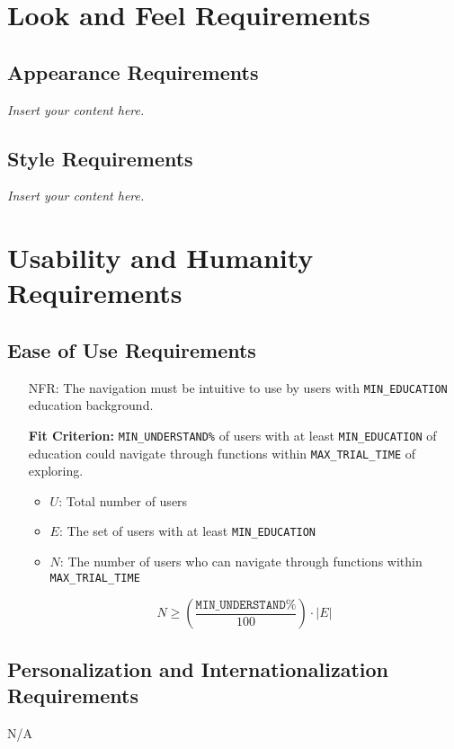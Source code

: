 \documentclass[12pt]{article}
\newcommand{\lips}{\textit{Insert your content here.}}
\newcounter{nfrnum} %
\newcommand{\rthenfrnum}{NFR\refstepcounter{nfrnum}\thenfrnum:}
\begin{document}
\section{Look and Feel Requirements}
\subsection{Appearance Requirements}
\lips
\subsection{Style Requirements}
\lips

\section{Usability and Humanity Requirements}
\subsection{Ease of Use Requirements}
\begin{itemize}
\item[\rthenfrnum]The navigation must be intuitive to use by users with \texttt{MIN\_EDUCATION} education background.

\textbf{Fit Criterion:} \texttt{MIN\_UNDERSTAND\%} of users with at least \texttt{MIN\_EDUCATION} of education could navigate through functions within \texttt{MAX\_TRIAL\_TIME} of exploring.

\begin{itemize}
    \item \( U \): Total number of users
    \item \( E \): The set of users with at least \texttt{MIN\_EDUCATION}
    \item \( N \): The number of users who can navigate through functions within \texttt{MAX\_TRIAL\_TIME}
\end{itemize}
\[
    N \geq \left( \frac{\texttt{MIN\_UNDERSTAND\%}}{100} \right) \cdot |E|
\]
\end{itemize}
\subsection{Personalization and Internationalization Requirements}
N/A
\end{document}
